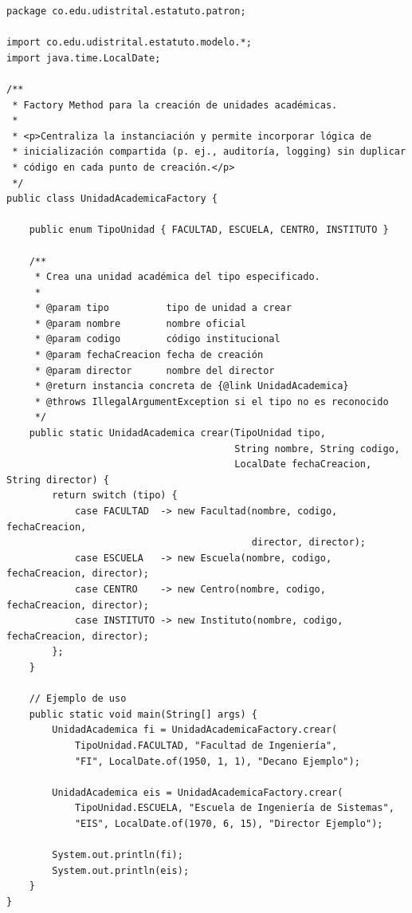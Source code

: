\begin{lstlisting}[style=javaStyle, caption={Factory Method para \texttt{UnidadAcademica}}, label={lst:factory}]
package co.edu.udistrital.estatuto.patron;

import co.edu.udistrital.estatuto.modelo.*;
import java.time.LocalDate;

/**
 * Factory Method para la creación de unidades académicas.
 *
 * <p>Centraliza la instanciación y permite incorporar lógica de
 * inicialización compartida (p. ej., auditoría, logging) sin duplicar
 * código en cada punto de creación.</p>
 */
public class UnidadAcademicaFactory {

    public enum TipoUnidad { FACULTAD, ESCUELA, CENTRO, INSTITUTO }

    /**
     * Crea una unidad académica del tipo especificado.
     *
     * @param tipo          tipo de unidad a crear
     * @param nombre        nombre oficial
     * @param codigo        código institucional
     * @param fechaCreacion fecha de creación
     * @param director      nombre del director
     * @return instancia concreta de {@link UnidadAcademica}
     * @throws IllegalArgumentException si el tipo no es reconocido
     */
    public static UnidadAcademica crear(TipoUnidad tipo,
                                        String nombre, String codigo,
                                        LocalDate fechaCreacion, String director) {
        return switch (tipo) {
            case FACULTAD  -> new Facultad(nombre, codigo, fechaCreacion,
                                           director, director);
            case ESCUELA   -> new Escuela(nombre, codigo, fechaCreacion, director);
            case CENTRO    -> new Centro(nombre, codigo, fechaCreacion, director);
            case INSTITUTO -> new Instituto(nombre, codigo, fechaCreacion, director);
        };
    }

    // Ejemplo de uso
    public static void main(String[] args) {
        UnidadAcademica fi = UnidadAcademicaFactory.crear(
            TipoUnidad.FACULTAD, "Facultad de Ingeniería",
            "FI", LocalDate.of(1950, 1, 1), "Decano Ejemplo");

        UnidadAcademica eis = UnidadAcademicaFactory.crear(
            TipoUnidad.ESCUELA, "Escuela de Ingeniería de Sistemas",
            "EIS", LocalDate.of(1970, 6, 15), "Director Ejemplo");

        System.out.println(fi);
        System.out.println(eis);
    }
}
\end{lstlisting}

